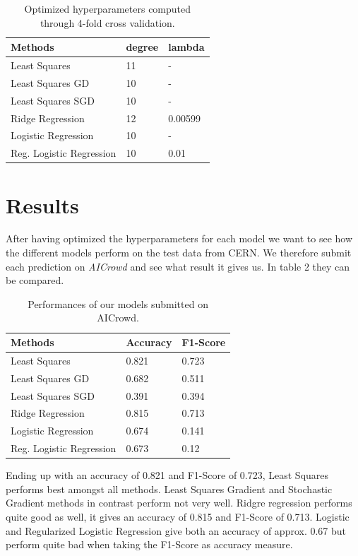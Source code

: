 \documentclass[10pt,conference,compsocconf]{IEEEtran}
\begin{document}
\begin{table}[htbp]
	\centering
	\begin{tabular}[c]{|l||l|l|}
		\hline
		Methods&degree&lambda\\
		\hline
		Least Squares& 11 &-\\
		Least Squares GD& 10 & -\\
		Least Squares SGD & 10 &-\\		Ridge Regression&12&0.00599\\
		Logistic Regression & 10&-\\
		Reg. Logistic Regression&10&0.01\\
		\hline
	\end{tabular}
	\caption{Optimized hyperparameters computed\\ through 4-fold cross validation.}
	\label{tab:hyperpam}
\end{table}

\newpage

\section{Results}


After having optimized the hyperparameters for each model we want to see how the different models perform on the test data from CERN. We therefore submit each prediction on \textit{AICrowd} and see what result it gives us. In table 2 they can be compared.


\begin{table}[h]
	\centering
	\begin{tabular}[c]{|l||l|l|}
		\hline
		Methods&Accuracy&F1-Score\\
		\hline
		Least Squares&0.821&0.723\\
		Least Squares GD&0.682&0.511\\
		Least Squares SGD&0.391&0.394\\		
		Ridge Regression&0.815&0.713\\
		Logistic Regression&0.674&0.141\\
		Reg. Logistic Regression&0.673&0.12\\
		\hline
	\end{tabular}
	\caption{Performances of our models submitted on AICrowd.}
	\label{tab:perform}
\end{table}

Ending up with an accuracy of 0.821 and F1-Score of 0.723, Least Squares performs best amongst all methods. Least Squares Gradient and Stochastic Gradient methods in contrast perform not very well. 
Ridgre regression performs quite good as well, it gives an accuracy of 0.815 and F1-Score of 0.713.
Logistic and Regularized Logistic Regression give both an accuracy of approx. 0.67 but perform quite bad when taking the F1-Score as accuracy measure. 
\end{document}
